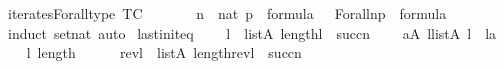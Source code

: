 \begin{isabellebody}
{\isafoldproof}%
%
\isadelimproof
%
\endisadelimproof
%
\isadelimdocument
%
\endisadelimdocument
%
\isatagdocument
%
\isamarkuptrue%
%
\endisatagdocument
{\isafolddocument}%
%
\isadelimdocument
%
\endisadelimdocument
{}\isamarkupfalse%
\ iterates{\isacharunderscore}{\kern0pt}Forall{\isacharunderscore}{\kern0pt}type\ {\isacharbrackleft}{\kern0pt}TC{\isacharbrackright}{\kern0pt}{\isacharcolon}{\kern0pt}\isanewline
\ \ \ \ \ \ {\isachardoublequoteopen}{\isasymlbrakk}\ n\ {\isasymin}\ nat{\isacharsemicolon}{\kern0pt}\ p\ {\isasymin}\ formula\ {\isasymrbrakk}\ {\isasymLongrightarrow}\ Forall{\isacharcircum}{\kern0pt}n{\isacharparenleft}{\kern0pt}p{\isacharparenright}{\kern0pt}\ {\isasymin}\ formula{\isachardoublequoteclose}\isanewline
%
\isadelimproof
\ \ %
\endisadelimproof
%
\isatagproof
{}\isamarkupfalse%
\ {\isacharparenleft}{\kern0pt}induct\ set{\isacharcolon}{\kern0pt}nat{\isacharcomma}{\kern0pt}\ auto{\isacharparenright}{\kern0pt}%
\endisatagproof
{\isafoldproof}%
%
\isadelimproof
\isanewline
%
\endisadelimproof
\isanewline
{}\isamarkupfalse%
\ last{\isacharunderscore}{\kern0pt}init{\isacharunderscore}{\kern0pt}eq\ {\isacharcolon}{\kern0pt}\isanewline
\ \ \ {\isachardoublequoteopen}l\ {\isasymin}\ list{\isacharparenleft}{\kern0pt}A{\isacharparenright}{\kern0pt}{\isachardoublequoteclose}\ {\isachardoublequoteopen}length{\isacharparenleft}{\kern0pt}l{\isacharparenright}{\kern0pt}\ {\isacharequal}{\kern0pt}\ succ{\isacharparenleft}{\kern0pt}n{\isacharparenright}{\kern0pt}{\isachardoublequoteclose}\isanewline
\ \ \ {\isachardoublequoteopen}{\isasymexists}\ a{\isasymin}A{\isachardot}{\kern0pt}\ {\isasymexists}l{\isacharprime}{\kern0pt}{\isasymin}list{\isacharparenleft}{\kern0pt}A{\isacharparenright}{\kern0pt}{\isachardot}{\kern0pt}\ l\ {\isacharequal}{\kern0pt}\ l{\isacharprime}{\kern0pt}{\isacharat}{\kern0pt}{\isacharbrackleft}{\kern0pt}a{\isacharbrackright}{\kern0pt}{\isachardoublequoteclose}\isanewline
%
\isadelimproof
%
\endisadelimproof
%
\isatagproof
{}\isamarkupfalse%
{\isacharminus}{\kern0pt}\isanewline
\ \ \isamarkupfalse%
\ {\isacartoucheopen}l{\isasymin}{\isacharunderscore}{\kern0pt}{\isacartoucheclose}\ {\isacartoucheopen}length{\isacharparenleft}{\kern0pt}{\isacharunderscore}{\kern0pt}{\isacharparenright}{\kern0pt}\ {\isacharequal}{\kern0pt}\ {\isacharunderscore}{\kern0pt}{\isacartoucheclose}\isanewline
\ \ \isamarkupfalse%
\ {\isachardoublequoteopen}rev{\isacharparenleft}{\kern0pt}l{\isacharparenright}{\kern0pt}\ {\isasymin}\ list{\isacharparenleft}{\kern0pt}A{\isacharparenright}{\kern0pt}{\isachardoublequoteclose}\ {\isachardoublequoteopen}length{\isacharparenleft}{\kern0pt}rev{\isacharparenleft}{\kern0pt}l{\isacharparenright}{\kern0pt}{\isacharparenright}{\kern0pt}\ {\isacharequal}{\kern0pt}\ succ{\isacharparenleft}{\kern0pt}n{\isacharparenright}{\kern0pt}{\isachardoublequoteclose}\isanewline

\end{isabellebody}
